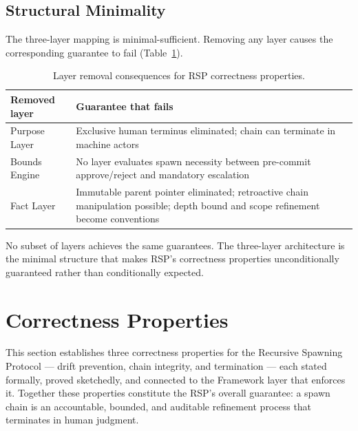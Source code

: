 \subsection{Structural Minimality}
\label{sec:rs-minimality}

The three-layer mapping is minimal-sufficient. Removing any layer causes the corresponding guarantee to fail (Table~\ref{tab:layer-minimality}).

\begin{table}[h]
\centering
\begin{tabular}{p{3.0cm} p{5.2cm}}
\toprule
\textbf{Removed layer} & \textbf{Guarantee that fails} \\
\midrule
Purpose Layer        & Exclusive human terminus eliminated; chain can terminate in machine actors \\
Bounds Engine        & No layer evaluates spawn necessity between pre-commit approve/reject and mandatory escalation \\
Fact Layer           & Immutable parent pointer eliminated; retroactive chain manipulation possible; depth bound and scope refinement become conventions \\
\bottomrule
\end{tabular}
\caption{Layer removal consequences for RSP correctness properties.}
\label{tab:layer-minimality}
\end{table}

No subset of layers achieves the same guarantees. The three-layer architecture is the minimal structure that makes RSP's correctness properties unconditionally guaranteed rather than conditionally expected.

\section{Correctness Properties}
\label{sec:rs-correctness}

This section establishes three correctness properties for the Recursive Spawning Protocol — drift prevention, chain integrity, and termination — each stated formally, proved sketchedly, and connected to the \bxthree Framework layer that enforces it. Together these properties constitute the RSP's overall guarantee: a spawn chain is an accountable, bounded, and auditable refinement process that terminates in human judgment.

